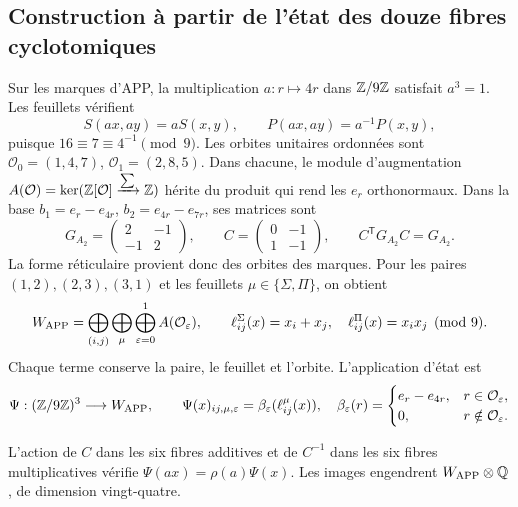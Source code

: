 \subsection{Construction à partir de l’état des douze fibres cyclotomiques}
\label{nuclear:fibras-app-witt}
Sur les marques d’APP, la multiplication \(a:r\mapsto4r\) dans
\(\mathbb Z/9\mathbb Z\) satisfait \(a^3=1\). Les feuillets vérifient
\[
 S(ax,ay)=aS(x,y),\qquad P(ax,ay)=a^{-1}P(x,y),
\]
puisque \(16\equiv7\equiv4^{-1}\pmod9\). Les orbites unitaires
ordonnées sont \(\mathcal O_0=(1,4,7)\), \(\mathcal O_1=(2,8,5)\).
Dans chacune, le module d’augmentation
\(A(\mathcal O)=\ker(\mathbb Z[\mathcal O]\xrightarrow{\sum}\mathbb Z)\)
hérite du produit qui rend les \(e_r\) orthonormaux. Dans la base
\(b_1=e_r-e_{4r}\), \(b_2=e_{4r}-e_{7r}\), ses matrices sont
\[
 G_{A_2}=\begin{pmatrix}2&-1\\-1&2\end{pmatrix},\qquad
 C=\begin{pmatrix}0&-1\\1&-1\end{pmatrix},\qquad
 C^{\mathsf T}G_{A_2}C=G_{A_2}.
\]
La forme réticulaire provient donc des orbites des marques. Pour les paires \((1,2),(2,3),(3,1)\) et les feuillets \(\mu\in\{\Sigma,\Pi\}\), on obtient
\[
 W_{\mathrm{APP}}=\bigoplus_{(i,j)}\bigoplus_\mu\bigoplus_{\varepsilon=0}^1
 A(\mathcal O_\varepsilon),\qquad
 \ell^\Sigma_{ij}(x)=x_i+x_j,\quad
 \ell^\Pi_{ij}(x)=x_ix_j\pmod9.
\]
Chaque terme conserve la paire, le feuillet et l'orbite. L'application d'état est
\[
 \Psi:(\mathbb Z/9\mathbb Z)^3\longrightarrow W_{\mathrm{APP}},\qquad
 \Psi(x)_{ij,\mu,\varepsilon}=\beta_\varepsilon(\ell^\mu_{ij}(x)),
 \quad
 \beta_\varepsilon(r)=
 \begin{cases}e_r-e_{4r},&r\in\mathcal O_\varepsilon,\\0,&r\notin\mathcal O_\varepsilon.
 \end{cases}
\]
\begin{proposition}
\label{nuclear:psi-rango}
L’action de \(C\) dans les six fibres additives et de \(C^{-1}\) dans
les six fibres multiplicatives vérifie \(\Psi(ax)=\rho(a)\Psi(x)\).
Les images engendrent \(W_{\mathrm{APP}}\otimes\mathbb Q\), de dimension vingt-quatre.
\end{proposition}

